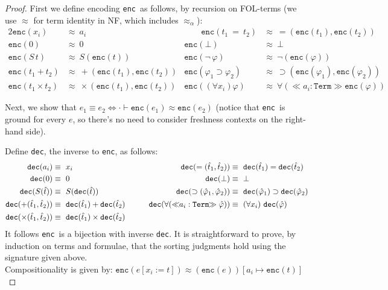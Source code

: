 \documentclass[copyright,creativecommons]{eptcs}
\newcounter{s}
\newcommand{\absort}[2]{\ensuremath{\ll\!\!#1\!\!\gg #2}}
\newcommand{\emptyCtx}{\cdot}
\newcommand {\al}       [0] {{\approx_\alpha}}
\newcommand {\aleq}     [0] {\mathrel{\al}}
\newcommand{\Trm}{\texttt{Term}}
\newcommand{\enc}{\texttt{enc}}
\newcommand{\dec}{\texttt{dec}}
\begin{document}
\begin{proof}
First we define encoding \enc\ as follows, by recursion on FOL-terms (we use $\approx$ for term identity in NF, which includes $\aleq$):
\begin{alignat*}{2}
\enc(x_i) & \approx \  a_i     & \qquad \enc(t_1 \ = \  t_2) & \approx \ =(\enc(t_1), \enc(t_2)) \\
\enc(0) & \approx \  0         &    \enc(\bot) & \approx \  \bot \\
\enc(S\,t) & \approx \  S(\enc(t)) & \enc(\neg\,\varphi) & \approx \  \neg(\enc(\varphi)) \\
\enc(t_1 + t_2) & \approx \  +(\enc(t_1), \enc(t_2)) & \enc(\varphi_1 \supset \varphi_2) & \approx \  \supset(\enc(\varphi_1), \enc(\varphi_2)) \\
\enc(t_1 \times t_2) & \approx \  \times(\enc(t_1), \enc(t_2)) & \enc((\forall x_i)\varphi) & \approx \  \forall (\absort{a_i:\Trm}\enc(\varphi))
\end{alignat*}

\noindent
Next, we show that $e_1 \equiv e_2 \iff \emptyCtx \vdash \enc(e_1) \approx \enc(e_2)$
 (notice that \enc\ is ground for every $e$, so there's no need to consider freshness contexts on the right-hand side).

\noindent
Define \dec, the inverse to \enc, as follows:
%
\begin{alignat*}{2}
\dec(a_i) & \equiv \ x_i & 
    \dec(=(\hat{t}_1, \hat{t}_2)) & \equiv \ \dec(\hat{t}_1) = \dec(\hat{t}_2) \\
\dec(0) & \equiv \ 0 & 
    \dec(\bot) & \equiv \ \bot \\
\dec(S(\hat{t})) & \equiv \ S(\dec(\hat{t})) & 
    \dec(\supset(\hat{\varphi}_1, \hat{\varphi}_2)) & \equiv \ \dec(\hat{\varphi}_1) \supset \dec(\hat{\varphi}_2) \\
\dec(+(\hat{t}_1, \hat{t}_2)) & \equiv \ \dec(\hat{t}_1) + \dec(\hat{t}_2) & 
    \qquad\dec(\forall(\absort{a_i:\Trm}\hat{\varphi})) & \equiv \ (\forall x_i)\ \dec(\hat{\varphi}) \\
\dec(\times(\hat{t}_1, \hat{t}_2)) & \equiv \ \dec(\hat{t}_1) \times \dec(\hat{t}_2) & 
\phantom{2} & \phantom{=} \phantom{b}
\end{alignat*}
%
\noindent
It follows \enc\ is a bijection with inverse \dec. It is straightforward to prove, by induction on terms and formulae, that the sorting judgments hold using the signature given above.\\

\noindent Compositionality is given by:
$\enc(e[x_i{:=}t]) \approx (\enc(e))[a_i \mapsto \enc(t)]$
\end{proof}
\end{document}
